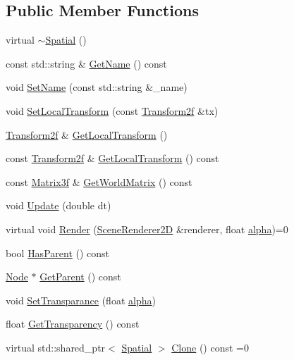 \subsection*{Public Member Functions}
\begin{DoxyCompactItemize}
\item 
virtual \hyperlink{classastu_1_1suite2d_1_1Spatial_ac6205d841cc2547b55061505b3326ff0}{$\sim$\+Spatial} ()
\item 
const std\+::string \& \hyperlink{classastu_1_1suite2d_1_1Spatial_a53456f456c3cccccd5d96be74f751622}{Get\+Name} () const
\item 
void \hyperlink{classastu_1_1suite2d_1_1Spatial_a938e9e652d177955245a8ce92e1133cb}{Set\+Name} (const std\+::string \&\+\_\+name)
\item 
void \hyperlink{classastu_1_1suite2d_1_1Spatial_a3cf75241f2921077a66810175e5f6071}{Set\+Local\+Transform} (const \hyperlink{group__math__group_gac67b5e9d27308a01ea8190ecb15e08fa}{Transform2f} \&tx)
\item 
\hyperlink{group__math__group_gac67b5e9d27308a01ea8190ecb15e08fa}{Transform2f} \& \hyperlink{classastu_1_1suite2d_1_1Spatial_a54e6c7004f30b5cf4fa75dd105c22052}{Get\+Local\+Transform} ()
\item 
const \hyperlink{group__math__group_gac67b5e9d27308a01ea8190ecb15e08fa}{Transform2f} \& \hyperlink{classastu_1_1suite2d_1_1Spatial_a9865215a9b5ed5ebe76fa04ec01220c7}{Get\+Local\+Transform} () const
\item 
const \hyperlink{classastu_1_1Matrix3}{Matrix3f} \& \hyperlink{classastu_1_1suite2d_1_1Spatial_a4dbd0d78ad2b6921c9b4067e7ce07465}{Get\+World\+Matrix} () const
\item 
void \hyperlink{classastu_1_1suite2d_1_1Spatial_aca3b41b57739b71d27f50a38517cd30b}{Update} (double dt)
\item 
virtual void \hyperlink{classastu_1_1suite2d_1_1Spatial_afaf7797d00a432012298535ba11348b7}{Render} (\hyperlink{classastu_1_1suite2d_1_1SceneRenderer2D}{Scene\+Renderer2D} \&renderer, float \hyperlink{classastu_1_1suite2d_1_1Spatial_a8aedfdadbece638bf283d4ba232c6928}{alpha})=0
\item 
bool \hyperlink{classastu_1_1suite2d_1_1Spatial_a0bc597fb32a23dab3a63b3d4cdd3567a}{Has\+Parent} () const
\item 
\hyperlink{classastu_1_1suite2d_1_1Node}{Node} $\ast$ \hyperlink{classastu_1_1suite2d_1_1Spatial_ad16fc3b6a6f31a15606953499de058bc}{Get\+Parent} () const
\item 
void \hyperlink{classastu_1_1suite2d_1_1Spatial_a24f5b6f78fa3b70f865369b71bb15910}{Set\+Transparance} (float \hyperlink{classastu_1_1suite2d_1_1Spatial_a8aedfdadbece638bf283d4ba232c6928}{alpha})
\item 
float \hyperlink{classastu_1_1suite2d_1_1Spatial_ac7face6d319542d0b9061b0d26c3bc2d}{Get\+Transparency} () const
\item 
virtual std\+::shared\+\_\+ptr$<$ \hyperlink{classastu_1_1suite2d_1_1Spatial}{Spatial} $>$ \hyperlink{classastu_1_1suite2d_1_1Spatial_a5c058079c94b0e8d7590e70ca2159bd1}{Clone} () const =0
\end{DoxyCompactItemize}
